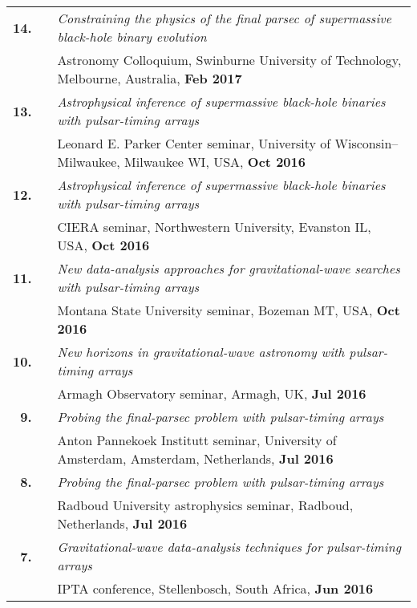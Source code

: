 \documentclass[11pt,letterpaper,sans]{moderncv}
\begin{document}
{\begin{longtable}{rp{0.3cm}p{15.8cm}}
\textbf{14.} & & \textit{Constraining the physics of the final parsec of supermassive black-hole binary evolution} \\ 
&& Astronomy Colloquium, Swinburne University of Technology, Melbourne, Australia, \textbf{Feb 2017} \vspace{0.09cm}\\
\textbf{13.} & & \textit{Astrophysical inference of supermassive black-hole binaries with pulsar-timing arrays} \\ 
&& Leonard E. Parker Center seminar, University of Wisconsin--Milwaukee, Milwaukee WI, USA, \textbf{Oct 2016} \vspace{0.09cm}\\
\textbf{12.} & & \textit{Astrophysical inference of supermassive black-hole binaries with pulsar-timing arrays} \\ 
&& CIERA seminar, Northwestern University, Evanston IL, USA, \textbf{Oct 2016} \vspace{0.09cm}\\
\textbf{11.} & & \textit{New data-analysis approaches for gravitational-wave searches with pulsar-timing arrays} \\ 
&& Montana State University seminar, Bozeman MT, USA, \textbf{Oct 2016} \vspace{0.09cm}\\
\textbf{10.} & & \textit{New horizons in gravitational-wave astronomy with pulsar-timing arrays} \\ 
&& Armagh Observatory seminar, Armagh, UK, \textbf{Jul 2016} \vspace{0.09cm}\\
\textbf{9.} & & \textit{Probing the final-parsec problem with pulsar-timing arrays} \\ 
&& Anton Pannekoek Institutt seminar, University of Amsterdam, Amsterdam, Netherlands, \textbf{Jul 2016} \vspace{0.09cm}\\
\textbf{8.} & & \textit{Probing the final-parsec problem with pulsar-timing arrays} \\ 
&& Radboud University astrophysics seminar, Radboud, Netherlands, \textbf{Jul 2016} \vspace{0.09cm}\\
\textbf{7.} & & \textit{Gravitational-wave data-analysis techniques for pulsar-timing arrays} \\ 
&& IPTA conference, Stellenbosch, South Africa, \textbf{Jun 2016} \vspace{0.09cm}\\

\end{longtable}}
\end{document}
